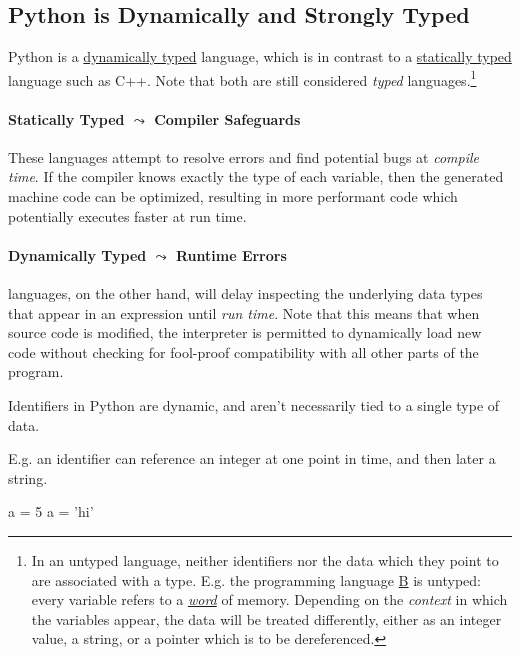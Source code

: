 \documentclass[12pt,letterpaper,twoside]{article}
\begin{document}
\subsection{Python is Dynamically and Strongly Typed}
Python is a 
\href{https://en.wikipedia.org/wiki/Type_system#Dynamic_type_checking_and_runtime_type_information}{dynamically typed} 
language, which is in contrast to a 
\href{https://en.wikipedia.org/wiki/Type_system#Static_type_checking}{statically typed} language such as C++. 
Note that both are still considered \emph{typed} languages.\footnote{In an untyped language, neither identifiers
nor the data which they point to are associated with a type. E.g. the programming language \href{https://en.wikipedia.org/wiki/B_(programming_language)#History}{B} is untyped: every variable refers to a \href{https://en.wikipedia.org/wiki/Word_(computer_architecture)}{\emph{word}} of memory. Depending on the \emph{context}
in which the variables appear, the data will be treated differently, either as an integer value, a string, or a pointer which is to be dereferenced.}

\paragraph{Statically Typed $\leadsto$ Compiler Safeguards} These languages attempt to resolve errors and find potential bugs at \emph{compile time}.
If the compiler knows exactly the type of each variable, then the generated machine code can be optimized, resulting in more performant code which potentially executes faster
at run time. 

\paragraph{Dynamically Typed $\leadsto$ Runtime Errors} languages, on the other hand, 
will delay inspecting the underlying data types that appear in an expression until \emph{run time}. Note that this means that when source code is modified,
the interpreter is permitted to dynamically load new code without checking for fool-proof compatibility with all other parts of the program.

Identifiers in Python are dynamic, and aren't necessarily tied to a single type of data.

E.g. an identifier can reference an
integer at one point in time, and then later a string.

\begin{python}
a = 5
a = 'hi'
\end{python}
\end{document}
